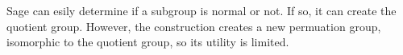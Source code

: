Sage can esily determine if a subgroup is normal or not.  If so, it can create the quotient group.  However, the construction creates a new permuation group, isomorphic to the quotient group, so its utility is limited.